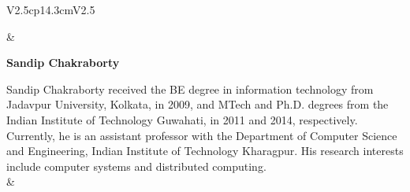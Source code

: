 \begin{tabular}{V{2.5}cp{14.3cm}V{2.5}}

 & 

\centerline{\large\bf Sandip Chakraborty}

\bigskip
Sandip Chakraborty received the BE degree in information technology from Jadavpur University, Kolkata, in 2009, and MTech and Ph.D. degrees from the Indian Institute of Technology Guwahati, in 2011 and 2014, respectively. Currently, he is an assistant professor with the Department of Computer Science and Engineering, Indian Institute of Technology Kharagpur. His research interests include computer systems and distributed computing.\\
&\\
\end{tabular}




